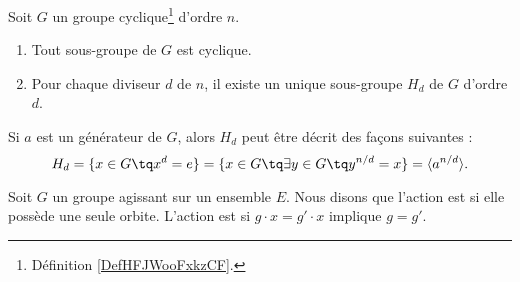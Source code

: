 \begin{theorem}     \label{THOooRGSTooIWyhqt}
    Soit \( G\) un groupe cyclique\footnote{Définition \ref{DefHFJWooFxkzCF}.} d'ordre \( n\).
    \begin{enumerate}
        \item
            Tout sous-groupe de \( G\) est cyclique.
        \item
            Pour chaque diviseur \( d\) de \( n\), il existe un unique sous-groupe \( H_d\) de \( G\) d'ordre \( d\).
    \end{enumerate}
    Si \( a\) est un générateur de \( G\), alors \( H_d\) peut être décrit des façons suivantes :
    \begin{equation}
        H_d=\{ x\in G\tq x^d=e \}=\{ x\in G\tq\exists y\in G\tq y^{n/d}=x \}=\langle a^{n/d}\rangle.
    \end{equation}
\end{theorem}


\begin{definition}      \label{DEFooQDHPooCfDEuL}
    Soit \( G\) un groupe agissant sur un ensemble \( E\). Nous disons que l'action est  si elle possède une seule orbite. L'action est  si \( g\cdot x=g'\cdot x\) implique \( g=g'\).
\end{definition}
